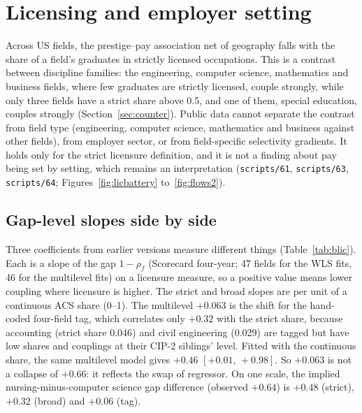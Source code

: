 \documentclass[11pt]{article}
\newcommand{\ci}[2]{$[#1,\allowbreak\,#2]$}
\newcommand{\scr}[1]{\texttt{scripts/#1}}
\begin{document}
\clearpage
\section{Licensing and employer setting}\label{sec:licensing}

Across US fields, the prestige--pay association net of geography falls with the share of a field's graduates in
strictly licensed occupations. This is a contrast between discipline families: the engineering, computer science,
mathematics and business fields, where few graduates are strictly licensed, couple strongly, while only three
fields have a strict share above 0.5, and one of them, special education, couples strongly
(Section~\ref{sec:counter}). Public data cannot separate the contrast from field type (engineering, computer
science, mathematics and business against other fields), from employer sector, or from field-specific
selectivity gradients. It holds only for the strict licensure definition, and it is not a finding about pay being
set by setting, which remains an interpretation (\scr{61}, \scr{63}, \scr{64}; Figures~\ref{fig:licbattery}
to~\ref{fig:flows2}).

\subsection{Gap-level slopes side by side}\label{sec:blicensure}

Three coefficients from earlier versions measure different things (Table~\ref{tab:blic}). Each is a slope of the gap
$1-\rho_f$ (Scorecard four-year; 47 fields for the WLS fits, 46 for the multilevel fits) on a licensure measure, so a positive value means lower coupling where
licensure is higher. The strict and broad slopes are per unit of a continuous ACS share (0--1). The multilevel
$+0.063$ is the shift for the hand-coded four-field tag, which correlates only $+0.32$ with the strict share, because
accounting (strict share 0.046) and civil engineering (0.029) are tagged but have low shares and couplings at their
CIP-2 siblings' level. Fitted with the continuous share, the same multilevel model gives $+0.46$ \ci{+0.01}{+0.98}. So
$+0.063$ is not a collapse of $+0.66$: it reflects the swap of regressor. On one scale, the implied nursing-minus-computer
science gap difference (observed $+0.64$) is $+0.48$ (strict), $+0.32$ (broad) and $+0.06$ (tag).
\end{document}
